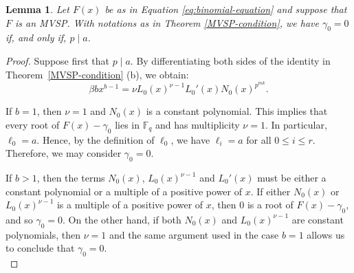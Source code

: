 \documentclass[preprint,12pt]{elsarticle}
\newtheorem{lemma}[theorem]{Lemma}
\begin{document}
\begin{lemma}\label{lem1}
    Let $F(x)$ be as in Equation \eqref{eq:binomial-equation} and suppose that $F$ is an MVSP. With notations as in Theorem \ref{MVSP-condition}, we have $\gamma_0 = 0$ if, and only if, $p \mid a$.
\end{lemma}
\begin{proof}
    Suppose first that $p \mid a$. By differentiating both sides of the identity in Theorem~\ref{MVSP-condition} (b), we obtain:
    \begin{equation*}
        \beta b x^{b - 1} = \nu L_0(x)^{\nu - 1} L_0'(x) N_0(x)^{p^{mk}}.
    \end{equation*}

   If \( b = 1 \), then \( \nu = 1 \) and \( N_0(x) \) is a constant polynomial. This implies that every root of \( F(x) - \gamma_0 \) lies in \( \mathbb{F}_q \) and has multiplicity \( \nu = 1 \). In particular, \( \ell_0 = a \). Hence, by the definition of \( \ell_0 \), we have \( \ell_i = a \) for all \( 0 \leq i \leq r \). Therefore, we may consider \( \gamma_0 = 0 \).

    If \( b > 1 \), then the terms \( N_0(x) \), \( L_0(x)^{\nu - 1} \) and \( L_0'(x) \) must be either a constant polynomial or a multiple of a positive power of \( x \). If either \( N_0(x) \) or \( L_0(x)^{\nu - 1} \) is a multiple of a positive power of \( x \), then $0$ is a root of $F(x) - \gamma_0$, and so \( \gamma_0 = 0 \). On the other hand, if both \( N_0(x) \) and \( L_0(x)^{\nu - 1} \) are constant polynomials, then \( \nu = 1 \) and the same argument used in the case \( b = 1 \) allows us to conclude that \( \gamma_0 = 0 \).\\
    

\end{proof}
\end{document}
